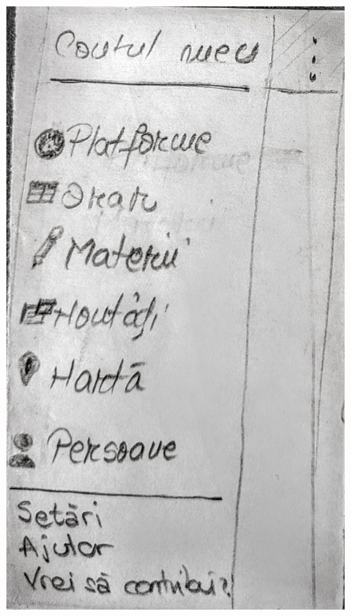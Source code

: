 \begin{figure}[ht]
         \includegraphics[height=0.279\textheight]{figures/app/paper/drawer.jpg}

\end{figure}
